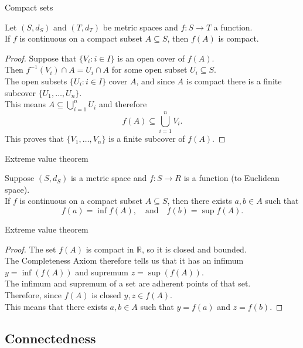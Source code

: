 \documentclass{beamer}
\begin{document}
\begin{frame}{Compact sets}
\begin{thm}
Let $(S,d_S)$ and $(T,d_T)$ be metric spaces and $f: S\rightarrow T$ a function.\\
If $f$ is continuous on a compact subset $A\subseteq S$, then $f(A)$ is compact.
\end{thm}
\pause
\begin{proof}
\pause
Suppose that $\{V_i: i\in I\}$ is an open cover of $f(A)$.\\
\pause
Then $f^{-1}(V_i)\cap A = U_i\cap A$ for some open subset $U_i\subseteq S$.\\
\pause
The open subsets $\{U_i: i\in I\}$ cover $A$, and since $A$ is compact there is a finite subcover $\{U_1,\dots,U_n\}$.\\
\pause
This means $A\subseteq \bigcup_{i=1}^n U_i$ and therefore
\pause
$$f(A)\subseteq \bigcup_{i=1}^n V_i.$$
\pause
This proves that $\{V_1,\dots, V_n\}$ is a finite subcover of $f(A)$.
\end{proof}
\end{frame}

\begin{frame}{Extreme value theorem}
\begin{thm}
Suppose $(S,d_S)$ is a metric space and $f: S\rightarrow R$ is a function (to Euclidean space).\\
If $f$ is continuous on a compact subset $A\subseteq S$, then there exists $a,b\in A$ such that
$$f(a) = \inf f(A),\quad\text{and}\quad f(b) = \sup f(A).$$
\end{thm}
\end{frame}

\begin{frame}{Extreme value theorem}
\pause
\begin{proof}
\pause
The set $f(A)$ is compact in $\mathbb{R}$, so it is closed and bounded.\\
\pause
The Completeness Axiom therefore tells us that it has an infimum $y=\inf(f(A))$ and supremum $z=\sup(f(A))$.\\
\pause
The infimum and supremum of a set are adherent points of that set.\\
\pause
Therefore, since $f(A)$ is closed $y,z\in f(A)$.\\
\pause
This means that there exists $a,b\in A$ such that $y=f(a)$ and $z=f(b)$.
\end{proof}
\end{frame}

\subsection{Connectedness}
\end{document}
